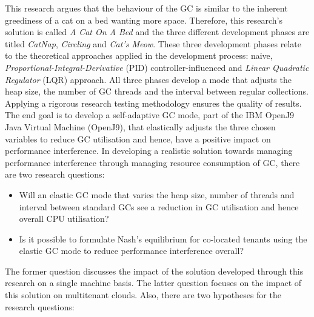 \newline\newline
This research argues that the behaviour of the GC is similar to the
inherent greediness of a cat on a bed wanting more space. Therefore,
this research's solution is called \emph{A Cat On A Bed} and the three
different development phases are titled \emph{CatNap}, \emph{Circling}
and \emph{Cat's Meow}.
\newline\newline
These three development phases relate to the theoretical approaches
applied in the development process: naive,
\emph{Proportional-Integral-Derivative} (PID) controller-influenced and
\emph{Linear Quadratic Regulator} (LQR) approach. All three phases
develop a mode that adjusts the heap size, the number of GC threads and
the interval between regular collections. Applying a rigorous research
testing methodology ensures the quality of results. The end goal is to
develop a self-adaptive GC mode, part of the IBM OpenJ9 Java Virtual
Machine (OpenJ9), that elastically adjusts the three chosen variables to
reduce GC utilisation and hence, have a positive impact on performance
interference.
\newline\newline
In developing a realistic solution towards managing performance
interference through managing resource consumption of GC, there are two
research questions:

\begin{itemize}
\item
  Will an elastic GC mode that varies the heap size, number of threads
  and interval between standard GCs see a reduction in GC utilisation
  and hence overall CPU utilisation?
\item
  Is it possible to formulate Nash's equilibrium for co-located tenants
  using the elastic GC mode to reduce performance interference overall?
\end{itemize}
The former question discusses the impact of the solution developed
through this research on a single machine basis. The latter question
focuses on the impact of this solution on multitenant clouds. Also,
there are two hypotheses for the research questions:

